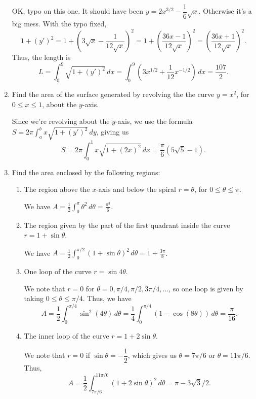 \documentclass[12pt]{article}
\newcommand{\di}{\displaystyle}
\begin{document}
\begin{enumerate}
\bigskip

OK, typo on this one. It should have been $y=2x^{3/2}-\dfrac{1}{6}\sqrt{x}$. Otherwise it's a big mess. With the typo fixed,
\[
 1+(y')^2 = 1+\left(3\sqrt{x}-\frac{1}{12\sqrt{x}}\right)^2 = 1+\left(\frac{36x-1}{12\sqrt{x}}\right)^2 = \left(\frac{36x+1}{12\sqrt{x}}\right)^2.
\]
Thus, the length is
\[
 L = \int_0^9\sqrt{1+(y')^2}\,dx = \int_0^9 \left(3x^{1/2}+\frac{1}{12}x^{-1/2}\right)\,dx = \frac{107}{2}.
\]

\item Find the area of the surface generated by revolving the the curve $y=x^2$, for $0\leq x\leq 1$, about the $y$-axis.

\bigskip

Since we're revolving about the $y$-axis, we use the formula $S = 2\pi\int_a^b x\sqrt{1+(y')^2}\,dy$, giving us
\[
 S = 2\pi\int_0^1 x\sqrt{1+(2x)^2}\,dx = \frac{\pi}{6}(5\sqrt{5}-1).
\]

\item Find the area enclosed by the following regions:
\begin{enumerate}
 \item The region above the $x$-axis and below the spiral $r=\theta$, for $0\leq \theta \leq \pi$.

We have $A = \di\frac{1}{2}\int_0^\pi \theta^2\,d\theta = \frac{\pi^3}{6}$.

 \item The region given by the part of the first quadrant inside the curve $r=1+\sin\theta$.

We have $A = \frac{1}{2}\int_0^{\pi/2}(1+\sin\theta)^2\,d\theta = 1+\frac{3\pi}{8}$.

 \item One loop of the curve $r=\sin 4\theta$.

We note that $r=0$ for $\theta = 0, \pi/4, \pi/2, 3\pi/4, \ldots$, so one loop is given by taking $0\leq \theta\leq \pi/4$. Thus, we have
\[
 A = \frac{1}{2}\int_0^{\pi/4}\sin^2(4\theta)\,d\theta = \frac{1}{4}\int_0^{\pi/4}(1-\cos(8\theta))\,d\theta  = \frac{\pi}{16}.
\]

 \item The inner loop of the curve $r=1+2\sin\theta$.

We note that $r=0$ if $\sin\theta = -\dfrac{1}{2}$, which gives us $\theta = 7\pi/6$ or $\theta = 11\pi/6$. Thus,
\[
 A = \frac{1}{2}\int_{7\pi/6}^{11\pi/6}(1+2\sin\theta)^2\,d\theta = \pi-3\sqrt{3}/2.
\]

\end{enumerate}



\end{enumerate}
\end{document}
